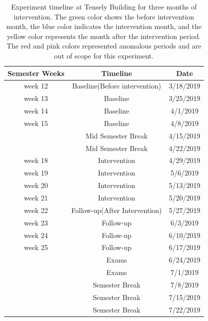 \begin{table}[ht]
\setlength{\arrayrulewidth}{0.5mm}
\setlength{\tabcolsep}{18pt}
    \centering
    \caption{Experiment timeline at Tensely Building for three months of intervention. The green color shows the before intervention month, the blue color indicates the intervention month, and the yellow color represents the month after the intervention period. The red and pink colors represented anomalous periods and are out of scope for this experiment.}
    \label{tons}
    \begin{tabular}{c c c}
    \hline
     \textbf{Semester Weeks} & \textbf{Timeline} & \textbf{Date} \\
     \hline\midrule
    \rowcolor{green}
     week 12 &  Baseline(Before intervention)  &  3/18/2019 \\
     \hline
    \rowcolor{green}
     week 13 & Baseline  & 3/25/2019 \\
     \hline
    \rowcolor{green}
     week 14 & Baseline   & 4/1/2019 \\
     \hline
    \rowcolor{green}
    week 15 &   Baseline & 4/8/2019 \\
     \hline
     \rowcolor{pink}
        & Mid Semester Break  & 4/15/2019 \\
      \hline
     \rowcolor{pink}
      &  Mid Semester Break  & 4/22/2019 \\
     \hline
     \rowcolor{cyan}
     week 18 & Intervention  & 4/29/2019 \\
     \hline
     \rowcolor{cyan}
     week 19 & Intervention   & 5/6/2019 \\
     \hline
     \rowcolor{cyan}
    week 20 &   Intervention & 5/13/2019 \\
     \hline
     \rowcolor{cyan}
      week 21  & Intervention  &  5/20/2019 \\
      \hline
     \rowcolor{yellow}
     week 22 &  Follow-up(After Intervention)  & 5/27/2019 \\
     \hline
     \rowcolor{yellow}
     week 23 & Follow-up  & 6/3/2019 \\
     \hline
     \rowcolor{yellow}
     week 24 & Follow-up   & 6/10/2019 \\
     \hline
     \rowcolor{yellow}
    week 25 &   Follow-up & 6/17/2019 \\
     \hline
     \rowcolor{red}
        & Exams  & 6/24/2019 \\
      \hline
     \rowcolor{red}
        & Exams  & 7/1/2019 \\
      \hline
      \rowcolor{pink}
         & Semester Break  &  7/8/2019 \\
      \hline
      \rowcolor{pink}
         & Semester Break  & 7/15/2019 \\
      \hline
      \rowcolor{pink}
         & Semester Break  &  7/22/2019 \\
      \hline
      
    \end{tabular}
    
\end{table}



